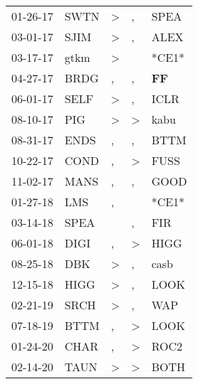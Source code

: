 \begin{supertabular}{p{0.07\textwidth}p{0.06\textwidth}p{0.02\textwidth}p{0.02\textwidth}p{0.06\textwidth}}
 01-26-17\textsuperscript{} &           SWTN\textsuperscript{} &     \textgreater &             , &         SPEA\textsuperscript{} \\
 03-01-17\textsuperscript{} &           SJIM\textsuperscript{} &     \textgreater &             , &         ALEX\textsuperscript{} \\
 03-17-17\textsuperscript{} &           gtkm\textsuperscript{} &     \textgreater &               &                          *CE1* \\
 04-27-17\textsuperscript{} &           BRDG\textsuperscript{} &                , &             , &  \textbf{FF\textsuperscript{}} \\
 06-01-17\textsuperscript{} &           SELF\textsuperscript{} &     \textgreater &             , &         ICLR\textsuperscript{} \\
 08-10-17\textsuperscript{} &            PIG\textsuperscript{} &     \textgreater &  \textgreater &         kabu\textsuperscript{} \\
 08-31-17\textsuperscript{} &           ENDS\textsuperscript{} &                , &             , &         BTTM\textsuperscript{} \\
 10-22-17\textsuperscript{} &           COND\textsuperscript{} &                , &  \textgreater &         FUSS\textsuperscript{} \\
 11-02-17\textsuperscript{} &           MANS\textsuperscript{} &                , &             , &         GOOD\textsuperscript{} \\
 01-27-18\textsuperscript{} &            LMS\textsuperscript{} &                , &               &                          *CE1* \\
 03-14-18\textsuperscript{} &           SPEA\textsuperscript{} &                  &             , &          FIR\textsuperscript{} \\
 06-01-18\textsuperscript{} &           DIGI\textsuperscript{} &                , &  \textgreater &         HIGG\textsuperscript{} \\
 08-25-18\textsuperscript{} &            DBK\textsuperscript{} &     \textgreater &             , &         casb\textsuperscript{} \\
 12-15-18\textsuperscript{} &           HIGG\textsuperscript{} &     \textgreater &             , &         LOOK\textsuperscript{} \\
 02-21-19\textsuperscript{} &           SRCH\textsuperscript{} &     \textgreater &             , &          WAP\textsuperscript{} \\
 07-18-19\textsuperscript{} &           BTTM\textsuperscript{} &                , &  \textgreater &         LOOK\textsuperscript{} \\
 01-24-20\textsuperscript{} &           CHAR\textsuperscript{} &                , &  \textgreater &         ROC2\textsuperscript{} \\
 02-14-20\textsuperscript{} &           TAUN\textsuperscript{} &     \textgreater &  \textgreater &         BOTH\textsuperscript{} \\
\end{supertabular}

